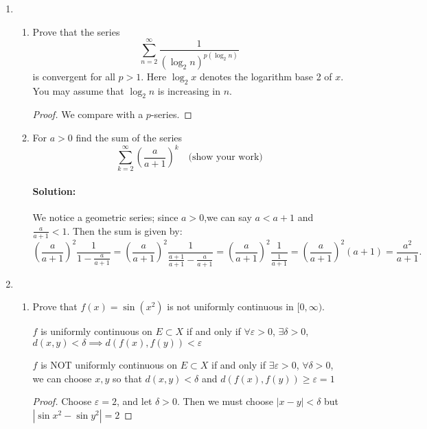 \documentclass{article}
\begin{document}
\begin{enumerate} 

\item \begin{enumerate}
        \item Prove that the series $$\sum_{n=2}^\infty\frac1{(\log_2n)^{p(\log_2n)}}$$
        is convergent for all $p>1.$ Here $\log_2x$ denotes the logarithm base 2 of $x.$ You may assume
        that $\log_2n$ is increasing in $n.$

        \begin{proof} 
            We compare with a $p$-series. %
        \end{proof}

        \item For $a>0$ find the sum of the series
        $$\sum_{k=2}^\infty\left(\frac a{a+1}\right)^k\quad\text{(show your work)}$$

        \paragraph{Solution: }We notice a geometric series; since $a>0$,we can say $a<a+1$ and $\frac{a}{a+1}<1$.
        Then the sum is given by:
        \[
        \left(\frac{a}{a+1}\right)^2 \frac{1}{1-\frac{a}{a+1}}=
        \left(\frac{a}{a+1}\right)^2 \frac{1}{\frac{a+1}{a+1}-\frac{a}{a+1}}=
        \left(\frac{a}{a+1}\right)^2 \frac{1}{\frac{1}{a+1}}=
        \left(\frac{a}{a+1}\right)^2 (a+1)=\frac{a^2}{a+1}
        .\] 

    \end{enumerate}
\item \begin{enumerate}
        \item Prove that $f\left(x\right)=\sin\left(x^{2}\right)$ is not uniformly continuous in $[0,\infty).$

            $f$ is uniformly continuous on $E\subset X$ if and only if $\forall\varepsilon>0$, $\exists \delta>0$, $d(x,y)<\delta\implies d(f(x),f(y))<\varepsilon$

            $f$ is NOT uniformly continuous on $E\subset X$ if and only if $\exists\varepsilon>0$, $\forall  \delta>0$, we can choose $x,y$ so that $d(x,y)<\delta$ and $ d(f(x),f(y))\geq\varepsilon=1$
            \begin{proof} 

                Choose $\varepsilon=2$, and let $\delta>0$. Then we must choose $|x-y|<\delta$ but 
                $|\sin x^2-\sin y^2|=2$


\end{proof}
\end{enumerate}
\end{enumerate}
\end{document}
